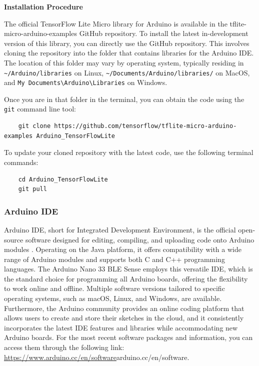 \textbf{Installation Procedure}

The official TensorFlow Lite Micro library for Arduino is available in the tflite-micro-arduino-examples GitHub repository. To install the latest in-development version of this library, you can directly use the GitHub repository. This involves cloning the repository into the folder that contains libraries for the Arduino IDE. The location of this folder may vary by operating system, typically residing in \texttt{\textasciitilde/Arduino/libraries} on Linux, \texttt{\textasciitilde/Documents/Arduino/libraries/} on MacOS, and \texttt{My Documents\textbackslash Arduino\textbackslash Libraries} on Windows.

Once you are in that folder in the terminal, you can obtain the code using the \texttt{git} command line tool:

\begin{verbatim}
	git clone https://github.com/tensorflow/tflite-micro-arduino-examples Arduino_TensorFlowLite
\end{verbatim}

To update your cloned repository with the latest code, use the following terminal commands:

\begin{verbatim}
	cd Arduino_TensorFlowLite
	git pull
\end{verbatim}

\subsubsection{Arduino IDE}

Arduino IDE, short for Integrated Development Environment, is the official open-source software designed for editing, compiling, and uploading code onto Arduino modules \cite{Warden:2019}. Operating on the Java platform, it offers compatibility with a wide range of Arduino modules and supports both C and C++ programming languages. The Arduino Nano 33 BLE Sense employs this versatile IDE, which is the standard choice for programming all Arduino boards, offering the flexibility to work online and offline. Multiple software versions tailored to specific operating systems, such as macOS, Linux, and Windows, are available. Furthermore, the Arduino community provides an online coding platform that allows users to create and store their sketches in the cloud, and it consistently incorporates the latest IDE features and libraries while accommodating new Arduino boards. For the most recent software packages and information, you can access them through the following link: \url{https://www.arduino.cc/en/software}{arduino.cc/en/software}.

